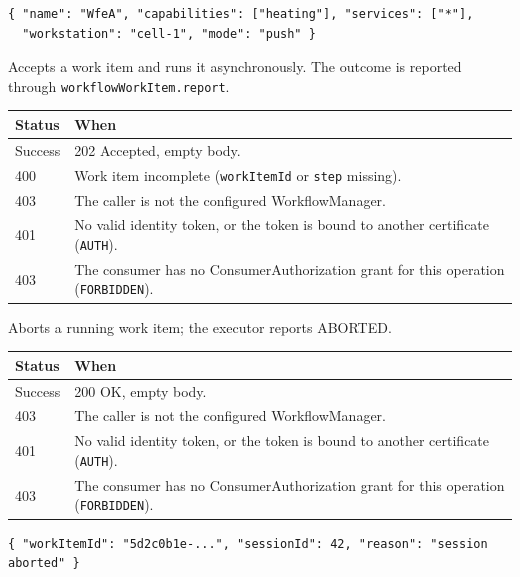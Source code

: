 \documentclass[a4paper]{arrowhead}
\begin{document}
\begin{lstlisting}[caption={Example response body}]
{ "name": "WfeA", "capabilities": ["heating"], "services": ["*"],
  "workstation": "cell-1", "mode": "push" }
\end{lstlisting}

Accepts a work item and runs it asynchronously. The outcome is reported through \texttt{workflow\allowbreak{}Work\allowbreak{}Item.\allowbreak{}report}.

{\small
\begin{longtable}{|p{2.0cm}|p{13.8cm}|}

\hline
\rowcolor{gray!33} Status & When \\ \hline
\endhead
Success & 202 Accepted, empty body. \\ \hline
400 & Work item incomplete (\texttt{workItemId} or \texttt{step} missing). \\ \hline
403 & The caller is not the configured WorkflowManager. \\ \hline
401 & No valid identity token, or the token is bound to another certificate (\texttt{AUTH}). \\ \hline
403 & The consumer has no ConsumerAuthorization grant for this operation (\texttt{FORBIDDEN}). \\ \hline
\end{longtable}
}

Aborts a running work item; the executor reports ABORTED.

{\small
\begin{longtable}{|p{2.0cm}|p{13.8cm}|}

\hline
\rowcolor{gray!33} Status & When \\ \hline
\endhead
Success & 200 OK, empty body. \\ \hline
403 & The caller is not the configured WorkflowManager. \\ \hline
401 & No valid identity token, or the token is bound to another certificate (\texttt{AUTH}). \\ \hline
403 & The consumer has no ConsumerAuthorization grant for this operation (\texttt{FORBIDDEN}). \\ \hline
\end{longtable}
}


\begin{lstlisting}[caption={Example request body}]
{ "workItemId": "5d2c0b1e-...", "sessionId": 42, "reason": "session aborted" }
\end{lstlisting}
\end{document}
